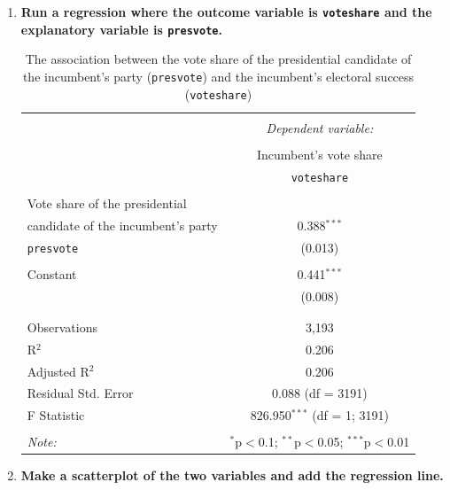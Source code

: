 \documentclass[12pt,letterpaper]{article}
\begin{document}
\begin{enumerate}
	\item \textbf{Run a regression where the outcome variable is \texttt{voteshare} and the explanatory variable is \texttt{presvote}.}

		

		\begin{table}[H] \centering 
			\caption{The association between the vote share of the
				presidential candidate of the incumbent's party (\texttt{presvote}) and the incumbent's electoral success (\texttt{voteshare})}
			\label{} 
			\begin{tabular}{@{\extracolsep{5pt}}lc} 
				\\[-1.8ex]\hline 
				\hline \\[-1.8ex] 
				& \multicolumn{1}{c}{\textit{Dependent variable:}} \\ 
				\cline{2-2} 
				\\[-1.8ex] & Incumbent's vote share \\
				& \texttt{voteshare} \\
				\hline \\[-1.8ex] 
				Vote share of the presidential \\ 
				candidate of the incumbent's party & 0.388$^{***}$ \\ 
				\texttt{presvote} & (0.013) \\ 
				& \\ 
				Constant & 0.441$^{***}$ \\ 
				& (0.008) \\ 
				& \\ 
				\hline \\[-1.8ex] 
				Observations & 3,193 \\ 
				R$^{2}$ & 0.206 \\ 
				Adjusted R$^{2}$ & 0.206 \\ 
				Residual Std. Error & 0.088 (df = 3191) \\ 
				F Statistic & 826.950$^{***}$ (df = 1; 3191) \\ 
				\hline 
				\hline \\[-1.8ex] 
				\textit{Note:}  & \multicolumn{1}{r}{$^{*}$p$<$0.1; $^{**}$p$<$0.05; $^{***}$p$<$0.01} \\ 
			\end{tabular} 
		\end{table}

	\item \textbf{Make a scatterplot of the two variables and add the regression line.}


\end{enumerate}
\end{document}
